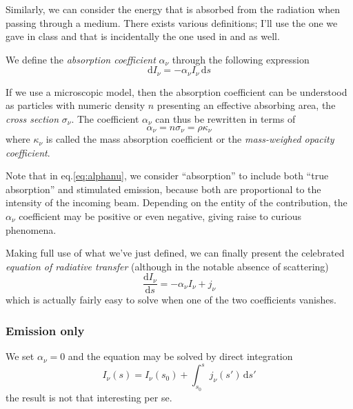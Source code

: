Similarly, we can consider the energy that is absorbed from the radiation when passing through a medium. There exists various definitions; I'll use the one we gave in class and that is incidentally the one used in \cite{choudhuri} and \cite{1986rpa..book.....R} as well.
\par We define the \emph{absorption coefficient} $\alpha_{\nu}$ through the following expression
\begin{equation}
	\text{d}I_{\nu} = -\alpha_{\nu}I_{\nu}\,\text{d}s
	\label{eq:alphanu}
\end{equation}
\par If we use a microscopic model, then the absorption coefficient can be understood as particles with numeric density $n$ presenting an effective absorbing area, the \emph{cross section} $\sigma_{\nu}$. The coefficient $\alpha_{\nu}$ can thus be rewritten in terms of
\begin{equation*}
	\alpha_{\nu} = n\sigma_{\nu} = \rho \kappa_{\nu}
\end{equation*}
where $\kappa_{\nu}$ is called the mass absorption coefficient or the \emph{mass-weighed opacity coefficient}.
\par Note that in eq.\ref{eq:alphanu}, we consider “absorption” to include both “true absorption” and stimulated emission, because both are proportional to the intensity of the incoming beam. Depending on the entity of the contribution, the $\alpha_{\nu}$ coefficient may be positive or even negative, giving raise to curious phenomena.
\vspace{0.5cm}
\par Making full use of what we've just defined, we can finally present the celebrated \emph{equation of radiative transfer} (although in the notable absence of scattering)
\begin{equation}
	\frac{\text{d}I_{\nu}}{\text{d}s} = -\alpha_{\nu}I_{\nu}+j_{\nu}
	\label{eq:rt}
\end{equation}
which is actually fairly easy to solve when one of the two coefficients vanishes.

\subsubsection*{Emission only}

We set $\alpha_{\nu} = 0$ and the equation may be solved by direct integration
\begin{equation*}
	I_{\nu}(s) = I_{\nu}(s_{0})+\int_{s_{0}}^{s} j_{\nu}(s')\,\text{d}s'
\end{equation*}
the result is not that interesting per se.

